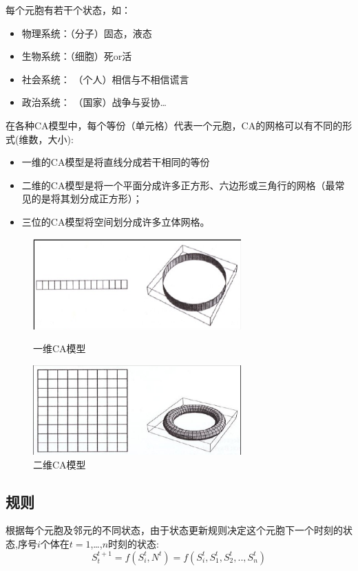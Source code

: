 \documentclass[UTF8]{ctexart}
\begin{document}
    \newpage
    每个元胞有若干个状态，如：
    \begin{itemize}
        \item 物理系统：（分子）固态，液态
        \item 生物系统：（细胞）死or活
        \item 社会系统： （个人）相信与不相信谎言
        \item 政治系统： （国家）战争与妥协\ldots
    \end{itemize}

    
    在各种CA模型中，每个等份（单元格）代表一个元胞，CA的网格可以有不同的形式(维数，大小):
    \begin{itemize}
        \item 一维的CA模型是将直线分成若干相同的等份
        \item 二维的CA模型是将一个平面分成许多正方形、六边形或三角行的网格（最常见的是将其划分成正方形）；
        \item 三位的CA模型将空间划分成许多立体网格。
    \end{itemize}
    
    \begin{figure}[h]
        \centering
        \includegraphics[width=8cm]{img/CA_model.png}
        \caption{一维CA模型}
        \includegraphics[width=8cm]{img/CA_model(1).png}
        \caption{二维CA模型}
    \end{figure}

    \subsection{规则}
    根据每个元胞及邻元的不同状态，由于状态更新规则决定这个元胞下一个时刻的状态,序号$i$个体在$t=1$,\dots,$n$时刻的状态:
    \begin{equation}
        S_t^{t+1}=f(S_i^t,N^t)=f(S_i^t,S_1^t,S_2^t,..,S_n^t)
    \end{equation}
\end{document}
